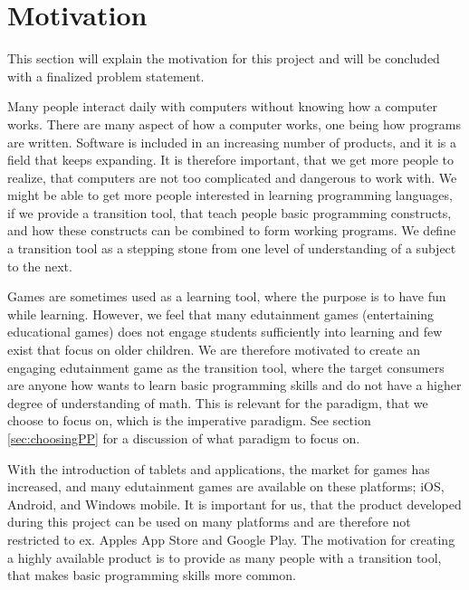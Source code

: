 \section{Motivation}
\label{sec:motivation}

This section will explain the motivation for this project and will be concluded with a finalized problem statement.\newline

Many people interact daily with computers without knowing how a computer works.
There are many aspect of how a computer works, one being how programs are written.
Software is included in an increasing number of products, and it is a field that keeps expanding.
It is therefore important, that we get more people to realize, that computers are not too complicated and dangerous to work with.
We might be able to get more people interested in learning programming languages, if we provide a transition tool, that teach people basic programming constructs, and how these constructs can be combined to form working programs.
We define a transition tool as a stepping stone from one level of understanding of a subject to the next.\newline

Games are sometimes used as a learning tool, where the purpose is to have fun while learning.
However, we feel that many edutainment games (entertaining educational games) does not engage students sufficiently into learning and few exist that focus on older children. 
We are therefore motivated to create an engaging edutainment game as the transition tool, where the target consumers are anyone how wants to learn basic programming skills and do not have a higher degree of understanding of math. This is relevant for the paradigm, that we choose to focus on, which is the imperative paradigm. See section \ref{sec:choosingPP} for a discussion of what paradigm to focus on.\newline

With the introduction of tablets and applications, the market for games has increased, and many edutainment games are available on these platforms; iOS, Android, and Windows mobile.
It is important for us, that the product developed during this project can be used on many platforms and are therefore not restricted to ex. Apples App Store and Google Play.
The motivation for creating a highly available product is to provide as many people with a transition tool, that makes basic programming skills more common.\newline

